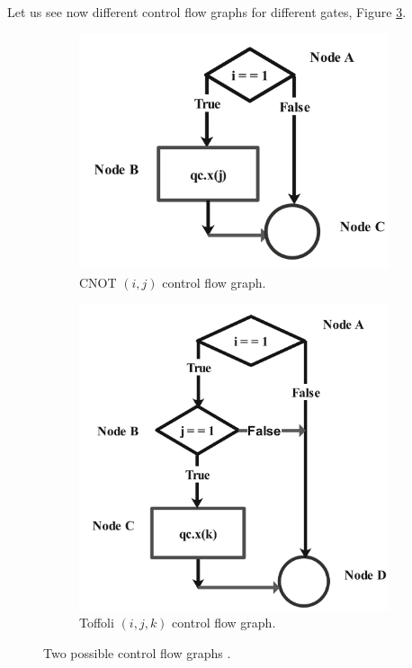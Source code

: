 \begin{itemize}
Let us see now different control flow graphs for different gates, Figure \ref{FIG:KumarCFG}.

\begin{figure}[H]
    \centering
    \begin{subfigure}[H]{0.48\textwidth}
        \centering
        \includegraphics[width=\textwidth]{TFM/photos/KumarCNOT.png}
        \caption{CNOT $(i,j)$ control flow graph.} 
        \label{Fig:KumarCNOT}
    \end{subfigure}
    \hfill
    \begin{subfigure}[H]{0.48\textwidth}
        \centering
        \includegraphics[width=\textwidth]{TFM/photos/KumarToffoli.png}
        \caption{Toffoli $(i,j,k)$ control flow graph.} 
        \label{Fig:KumarToffoli}
    \end{subfigure}
        \caption{Two possible control flow graphs \cite{kumar2023formalization}. }
    \label{FIG:KumarCFG}
 \end{figure}


\end{itemize}
